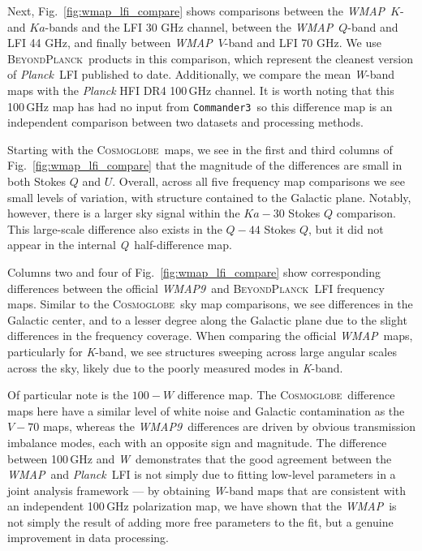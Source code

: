 \documentclass[twocolumn]{../../common/aa}
\def\WMAP{\emph{WMAP}}
\def\WMAPnine{\emph{WMAP9}}
\def\Planck{\emph{Planck}}
\def\commanderthree{\texttt{Commander3}}
\newcommand{\BP}{\textsc{BeyondPlanck}}
\newcommand{\cosmoglobe}{\textsc{Cosmoglobe}}
\newcommand{\K}[0]{\textit K}
\newcommand{\Ka}[0]{\textit{Ka}}
\newcommand{\Q}[0]{\textit Q}
\newcommand{\W}[0]{\textit W}
\begin{document}
Next, Fig.~\ref{fig:wmap_lfi_compare} shows comparisons between the
\WMAP\ $K$- and $Ka$-bands and the LFI 30 GHz channel, between the
\WMAP\ $Q$-band and LFI 44 GHz, and finally between \WMAP\ $V$-band
and LFI 70 GHz. We use \BP\ products in this comparison, which
represent the cleanest version of \Planck\ LFI published to
date. Additionally, we compare the mean \W-band maps with the \Planck
HFI DR4 100\,GHz channel. It is worth noting that this 100\,GHz map
has had no input from \commanderthree\ so this difference map is an
independent comparison between two datasets and processing methods.

Starting with the \cosmoglobe\ maps, we see in the first and third columns of
Fig.~\ref{fig:wmap_lfi_compare} that the magnitude of the differences are small
in both Stokes $Q$ and $U$. Overall, across all five frequency map comparisons
we see small levels of variation, with structure contained to the Galactic
plane. Notably, however, there is a larger sky signal within the
$\mathit{Ka}-30$ Stokes $Q$ comparison.
This large-scale difference also exists in the $\mathit Q-44$ Stokes
$Q$, but it did not appear in the internal \Q\ half-difference map.

Columns two and four of Fig.~\ref{fig:wmap_lfi_compare} show corresponding differences
between the official \WMAPnine\ and \BP\ LFI frequency maps. Similar to the
\cosmoglobe\ sky map comparisons, we see differences in the Galactic center,
and to a lesser degree along the Galactic plane due to the slight differences
in the frequency coverage. When comparing the official \WMAP\ maps,
particularly for \K-band, we see structures sweeping across large angular
scales across the sky, likely due to the poorly measured modes in \K-band. 


Of particular note is the $100-\mathit W$ difference map. The \cosmoglobe\
difference maps here have a similar level of white noise and Galactic
contamination as the $\mathit V-70$ maps,  whereas the \WMAPnine\ differences
are driven by obvious transmission imbalance modes, each with an opposite sign and
magnitude. The difference between 100\,GHz and \W\ demonstrates that the good
agreement between the \WMAP\ and \Planck\ LFI is not simply due to fitting
low-level parameters in a joint analysis framework --- by obtaining \W-band maps
that are consistent with an independent 100\,GHz polarization map, we have
shown that the \WMAP\ is not simply the result of adding more free parameters
to the fit, but a genuine improvement in data processing.
\end{document}
